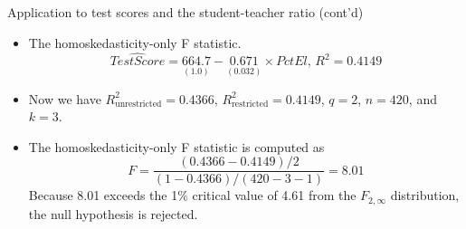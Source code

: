 \documentclass[presentation,10pt]{beamer}
\begin{document}
\begin{frame}[label={sec:org64c43dc}]{Application to test scores and the student-teacher ratio (cont'd)}
\begin{itemize}
\item The homoskedasticity-only F statistic.
\begin{equation*}
\widehat{TestScore} = \underset{{\displaystyle (1.0)}}{664.7}
 -\underset{\displaystyle (0.032)}{0.671} \times PctEl,\, R^2 = 0.4149
\end{equation*}

\item Now we have \(R^2_{\text{unrestricted}} = 0.4366\),
\(R^2_{\text{restricted}} = 0.4149\), \(q=2\), \(n = 420\), and \(k = 3\).

\item The homoskedasticity-only F statistic is computed as
\[F=\frac{(0.4366 - 0.4149)/2}{(1-0.4366)/(420-3-1)} = 8.01 \]
Because 8.01 exceeds the 1\% critical value of 4.61 from the
\(F_{2,\infty}\) distribution, the null hypothesis is rejected.
\end{itemize}
\end{frame}
\end{document}
